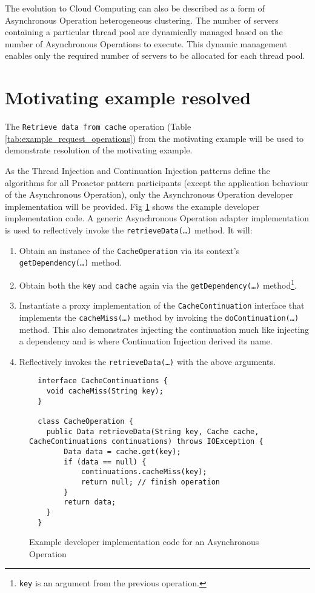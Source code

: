 \documentclass[prodmode]{style/acmlarge}
\begin{document}
The evolution to Cloud Computing can also be described as a form of Asynchronous
Operation heterogeneous clustering.  The number of servers containing a
particular thread pool are dynamically managed based on the number of
Asynchronous Operations to execute.  This dynamic management enables only the
required number of servers to be allocated for each thread pool.


\section{Motivating example resolved}

The \texttt{Retrieve data from cache} operation (Table
\ref{tab:example_request_operations}) from the motivating example will be used
to demonstrate resolution of the motivating example.  

As the Thread Injection and Continuation Injection patterns define the
algorithms for all Proactor pattern participants (except the application
behaviour of the Asynchronous Operation), only the Asynchronous Operation
developer implementation will be provided.  Fig
\ref{fig:Example_Method_Operation} shows the example developer implementation
code.  A generic Asynchronous Operation adapter implementation is used to
reflectively invoke the \texttt{retrieveData(\ldots)} method. It will:
\begin{enumerate}
  \item Obtain an instance of the \texttt{CacheOperation} via its context's \texttt{getDependency(\ldots)} method.
  \item Obtain both the \texttt{key} and \texttt{cache} again via the \texttt{getDependency(\ldots)} method\footnote{\texttt{key} is an argument from the previous operation.}.
  \item Instantiate a proxy implementation of the \texttt{CacheContinuation} interface that implements the \texttt{cacheMiss(\ldots)} method by invoking the \texttt{doContinuation(\ldots)} method.  This also demonstrates injecting the continuation much like injecting a dependency and is where Continuation Injection derived its name. 
  \item Reflectively invokes the \texttt{retrieveData(\ldots)} with the above arguments.
\end{enumerate}

\begin{figure}[tp]
\centering
\begin{verbatim}
  interface CacheContinuations {
    void cacheMiss(String key);
  }

  class CacheOperation {    
    public Data retrieveData(String key, Cache cache, CacheContinuations continuations) throws IOException {
        Data data = cache.get(key);
        if (data == null) {
            continuations.cacheMiss(key);
            return null; // finish operation
        }
        return data;
    }
  }
\end{verbatim}
\caption{Example developer implementation code for an Asynchronous Operation}
\label{fig:Example_Method_Operation}
\end{figure}
\end{document}
